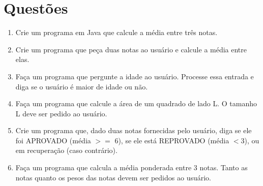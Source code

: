 \documentclass[12pt]{article}
\begin{document}

               

        
        
        
        





\section{Questões}

\begin{enumerate}
  \item Crie um programa em Java que calcule a média entre três notas.
  \item Crie um programa que peça duas notas ao usuário e calcule a média entre elas.
  \item Faça um programa que pergunte a idade ao usuário. Processe essa entrada e diga se o usuário é maior de idade ou não.
  \item Faça um programa que calcule a área de um quadrado de lado L. O tamanho L deve ser pedido ao usuário.
  \item Crie um programa que, dado duas notas fornecidas pelo usuário, diga se ele foi APROVADO (média $>=$ 6), se ele está REPROVADO (média $<3$), ou em recuperação (caso contrário).
  \item Faça um programa que calcula a média ponderada entre 3 notas. Tanto as notas quanto os pesos das notas devem ser pedidos ao usuário.
\end{enumerate}




\end{document}
